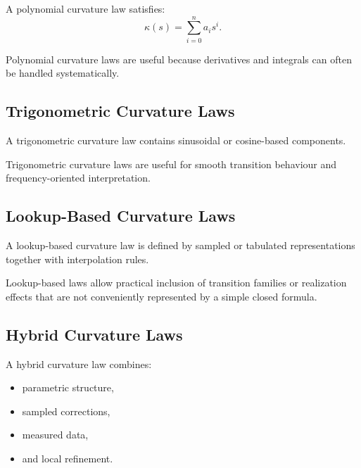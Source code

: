 \begin{definition}
\label{def:polynomial-curvature}
A polynomial curvature law satisfies:
\[
\kappa(s)
=
\sum_{i=0}^n a_i s^i.
\]
\end{definition}

Polynomial curvature laws are useful because derivatives and integrals
can often be handled systematically.


\subsection{Trigonometric Curvature Laws}

\begin{definition}
\label{def:trigonometric-curvature}
A trigonometric curvature law contains sinusoidal or cosine-based
components.
\end{definition}

Trigonometric curvature laws are useful for smooth transition behaviour
and frequency-oriented interpretation.


\subsection{Lookup-Based Curvature Laws}

\begin{definition}
\label{def:lookup-based-curvature}
A lookup-based curvature law is defined by sampled or tabulated
representations together with interpolation rules.
\end{definition}

Lookup-based laws allow practical inclusion of transition families or
realization effects that are not conveniently represented by a simple
closed formula.


\subsection{Hybrid Curvature Laws}

\begin{definition}
\label{def:hybrid-curvature-law}
A hybrid curvature law combines:
\begin{itemize}
\item parametric structure,
\item sampled corrections,
\item measured data,
\item and local refinement.
\end{itemize}
\end{definition}

